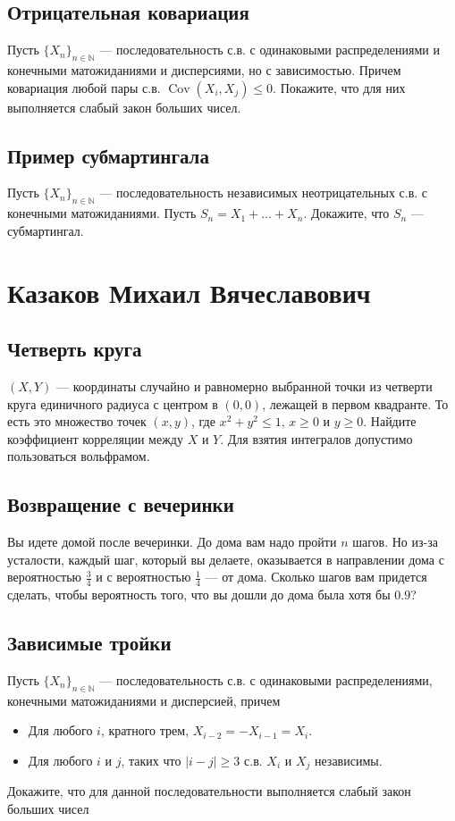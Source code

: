 \documentclass[12pt]{article}
\newcommand\N{\mathbb{N}}
\DeclareMathOperator{\Cov}{Cov}
\begin{document}
\subsection{Отрицательная ковариация}

Пусть $\{X_n\}_{n \in \N}$ --- последовательность с.в. с одинаковыми распределениями и конечными матожиданиями и дисперсиями, но с зависимостью. Причем ковариация любой пары с.в. $\Cov(X_i, X_j) \le 0$. Покажите, что для них выполняется слабый закон больших чисел.


\subsection{Пример субмартингала}

Пусть $\{X_n\}_{n \in \N}$ --- последовательность независимых неотрицательных с.в. с конечными матожиданиями. Пусть $S_n = X_1 + \dots + X_n$. Докажите, что $S_n$ --- субмартингал.

\newpage
\section{Казаков Михаил Вячеславович}

\subsection{Четверть круга}

$(X, Y)$ --- координаты случайно и равномерно выбранной точки из четверти круга единичного радиуса с центром в $(0, 0)$, лежащей в первом квадранте. То есть это множество точек $(x, y)$, где $x^2 + y^2 \le 1$, $x \ge 0$ и $y \ge 0$. Найдите коэффициент корреляции между $X$ и $Y$. Для взятия интегралов  допустимо пользоваться вольфрамом.


\subsection{Возвращение с вечеринки}

Вы идете домой после вечеринки. До дома вам надо пройти $n$ шагов. Но из-за усталости, каждый шаг, который вы делаете, оказывается в направлении дома с вероятностью $\frac{3}{4}$ и с вероятностью $\frac{1}{4}$ --- от дома. Сколько шагов вам придется сделать, чтобы вероятность того, что вы дошли до дома была хотя бы $0.9$?

\subsection{Зависимые тройки}
Пусть $\{X_n\}_{n \in \N}$ --- последовательность с.в. с одинаковыми распределениями, конечными матожиданиями и дисперсией, причем
\begin{itemize}
    \item Для любого $i$, кратного трем, $X_{i - 2} = - X_{i - 1} = X_{i}$. 
    \item Для любого $i$ и $j$, таких что $|i - j| \ge 3$ с.в. $X_i$ и $X_j$ независимы.
\end{itemize}
Докажите, что для данной последовательности выполняется слабый закон больших чисел
\end{document}
